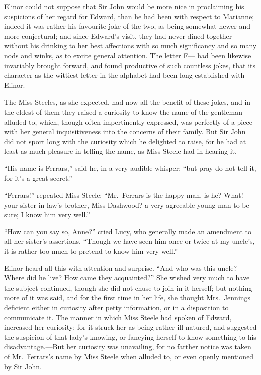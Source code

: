 \documentclass{article}
\begin{document}
Elinor could not suppose that Sir John would be more
nice in proclaiming his suspicions of her regard for Edward,
than he had been with respect to Marianne; indeed it was
rather his favourite joke of the two, as being somewhat
newer and more conjectural; and since Edward's visit,
they had never dined together without his drinking to her
best affections with so much significancy and so many nods
and winks, as to excite general attention.  The letter F---
had been likewise invariably brought forward, and found
productive of such countless jokes, that its character
as the wittiest letter in the alphabet had been long
established with Elinor.

The Miss Steeles, as she expected, had now all the
benefit of these jokes, and in the eldest of them they
raised a curiosity to know the name of the gentleman
alluded to, which, though often impertinently expressed,
was perfectly of a piece with her general inquisitiveness
into the concerns of their family.  But Sir John did not
sport long with the curiosity which he delighted to raise,
for he had at least as much pleasure in telling the name,
as Miss Steele had in hearing it.

``His name is Ferrars,'' said he, in a very audible whisper;
``but pray do not tell it, for it's a great secret.''

``Ferrars!'' repeated Miss Steele; ``Mr.\ Ferrars is
the happy man, is he? What! your sister-in-law's brother,
Miss Dashwood? a very agreeable young man to be sure;
I know him very well.''

``How can you say so, Anne?'' cried Lucy, who generally
made an amendment to all her sister's assertions.
``Though we have seen him once or twice at my uncle's, it
is rather too much to pretend to know him very well.''

Elinor heard all this with attention and surprise.
``And who was this uncle?  Where did he live?  How came
they acquainted?''  She wished very much to have the subject
continued, though she did not chuse to join in it herself;
but nothing more of it was said, and for the first time
in her life, she thought Mrs.\ Jennings deficient either
in curiosity after petty information, or in a disposition
to communicate it.  The manner in which Miss Steele had
spoken of Edward, increased her curiosity; for it struck
her as being rather ill-natured, and suggested the suspicion
of that lady's knowing, or fancying herself to know something
to his disadvantage.---But her curiosity was unavailing,
for no farther notice was taken of Mr.\ Ferrars's name by
Miss Steele when alluded to, or even openly mentioned by Sir
John.
\end{document}
